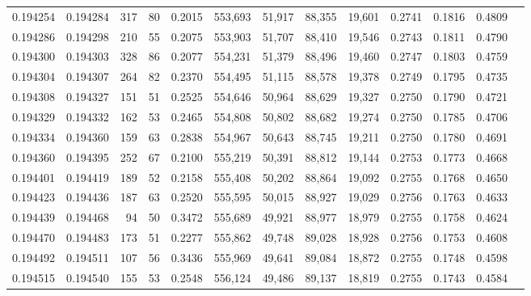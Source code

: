 \begin{tabular}{rrrrrrrrrrrrr}
0.194254 & 0.194284 &   317 &  80 &                                     0.2015 & 553,693 &  51,917 &  88,355 &  19,601 & 0.2741 & 0.1816 & 0.4809 \\
0.194286 & 0.194298 &   210 &  55 &                                     0.2075 & 553,903 &  51,707 &  88,410 &  19,546 & 0.2743 & 0.1811 & 0.4790 \\
0.194300 & 0.194303 &   328 &  86 &                                     0.2077 & 554,231 &  51,379 &  88,496 &  19,460 & 0.2747 & 0.1803 & 0.4759 \\
0.194304 & 0.194307 &   264 &  82 &                                     0.2370 & 554,495 &  51,115 &  88,578 &  19,378 & 0.2749 & 0.1795 & 0.4735 \\
0.194308 & 0.194327 &   151 &  51 &                                     0.2525 & 554,646 &  50,964 &  88,629 &  19,327 & 0.2750 & 0.1790 & 0.4721 \\
0.194329 & 0.194332 &   162 &  53 &                                     0.2465 & 554,808 &  50,802 &  88,682 &  19,274 & 0.2750 & 0.1785 & 0.4706 \\
0.194334 & 0.194360 &   159 &  63 &                                     0.2838 & 554,967 &  50,643 &  88,745 &  19,211 & 0.2750 & 0.1780 & 0.4691 \\
0.194360 & 0.194395 &   252 &  67 &                                     0.2100 & 555,219 &  50,391 &  88,812 &  19,144 & 0.2753 & 0.1773 & 0.4668 \\
0.194401 & 0.194419 &   189 &  52 &                                     0.2158 & 555,408 &  50,202 &  88,864 &  19,092 & 0.2755 & 0.1768 & 0.4650 \\
0.194423 & 0.194436 &   187 &  63 &                                     0.2520 & 555,595 &  50,015 &  88,927 &  19,029 & 0.2756 & 0.1763 & 0.4633 \\
0.194439 & 0.194468 &    94 &  50 &                                     0.3472 & 555,689 &  49,921 &  88,977 &  18,979 & 0.2755 & 0.1758 & 0.4624 \\
0.194470 & 0.194483 &   173 &  51 &                                     0.2277 & 555,862 &  49,748 &  89,028 &  18,928 & 0.2756 & 0.1753 & 0.4608 \\
0.194492 & 0.194511 &   107 &  56 &                                     0.3436 & 555,969 &  49,641 &  89,084 &  18,872 & 0.2755 & 0.1748 & 0.4598 \\
0.194515 & 0.194540 &   155 &  53 &                                     0.2548 & 556,124 &  49,486 &  89,137 &  18,819 & 0.2755 & 0.1743 & 0.4584 \\

\end{tabular}
